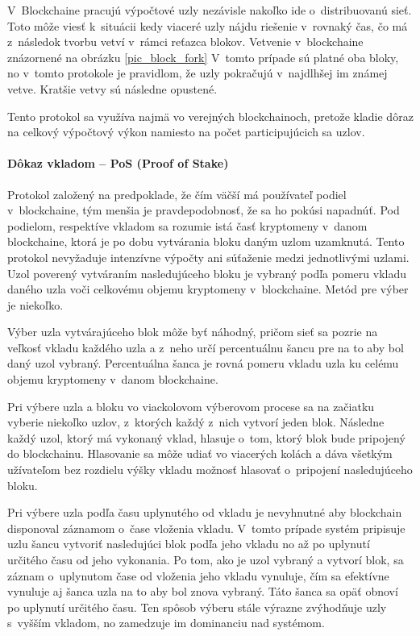 V~Blockchaine pracujú výpočtové uzly nezávisle nakoľko ide o~distribuovanú sieť. Toto môže viesť k~situácii kedy viaceré uzly nájdu riešenie v~rovnaký čas, čo má z~následok tvorbu vetví v~rámci reťazca blokov. Vetvenie v~blockchaine znázornené na obrázku \ref{pic_block_fork} V~tomto prípade sú platné oba bloky, no v~tomto protokole je pravidlom, že uzly pokračujú v~najdlhšej im známej vetve. Kratšie vetvy sú následne opustené.

Tento protokol sa využíva najmä vo verejných blockchainoch, pretože kladie dôraz na celkový výpočtový výkon namiesto na počet participujúcich sa uzlov.

\paragraph{Dôkaz vkladom – PoS (Proof of Stake)}

Protokol založený na predpoklade, že čím väčší má používateľ podiel v~blockchaine, tým menšia je pravdepodobnosť, že sa ho pokúsi napadnúť. Pod podielom, respektíve vkladom sa rozumie istá časť kryptomeny v~danom blockchaine, ktorá je po dobu vytvárania bloku daným uzlom uzamknutá. Tento protokol nevyžaduje intenzívne výpočty ani súťaženie medzi jednotlivými uzlami. Uzol poverený vytváraním nasledujúceho bloku je vybraný podľa pomeru vkladu daného uzla voči celkovému objemu kryptomeny v~blockchaine. Metód pre výber je niekoľko.

Výber uzla vytvárajúceho blok môže byť náhodný, pričom sieť sa pozrie na veľkosť vkladu každého uzla a z~neho určí percentuálnu šancu pre na to aby bol daný uzol vybraný. Percentuálna šanca je rovná pomeru vkladu uzla ku celému objemu kryptomeny v~danom blockchaine.

Pri výbere uzla a bloku vo viackolovom výberovom procese sa na začiatku vyberie niekoľko uzlov, z~ktorých každý z~nich vytvorí jeden blok. Následne každý uzol, ktorý má vykonaný vklad, hlasuje o~tom, ktorý blok bude pripojený do blockchainu. Hlasovanie sa môže udiať vo viacerých kolách a dáva všetkým užívateľom bez rozdielu výšky vkladu možnosť hlasovať o~pripojení nasledujúceho bloku.

Pri výbere uzla podľa času uplynutého od vkladu je nevyhnutné aby blockchain disponoval záznamom o~čase vloženia vkladu. V~tomto prípade systém pripisuje uzlu šancu vytvoriť nasledujúci blok podľa jeho vkladu no až po uplynutí určitého času od jeho vykonania. Po tom, ako je uzol vybraný a vytvorí blok, sa záznam o~uplynutom čase od vloženia jeho vkladu vynuluje, čím sa efektívne vynuluje aj šanca uzla na to aby bol znova vybraný. Táto šanca sa opäť obnoví po uplynutí určitého času. Ten spôsob výberu stále výrazne zvýhodňuje uzly s~vyšším vkladom, no zamedzuje im dominanciu nad systémom.

